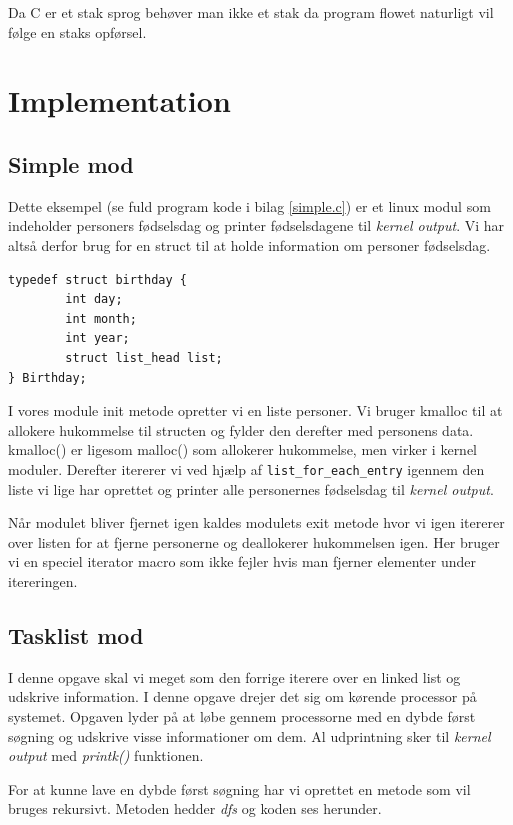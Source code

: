 \documentclass[danish]{report}
\begin{document}
Da C er et stak sprog behøver man ikke et stak da program flowet naturligt vil følge en staks opførsel.


\chapter{Implementation}
\begingroup
\let\clearpage\relax
\section{Simple mod}

Dette eksempel (se fuld program kode i bilag \ref{simple.c}) er et linux modul som indeholder personers fødselsdag og printer fødselsdagene til \textit{kernel output}. Vi har altså derfor brug for en struct til at holde information om personer fødselsdag.

\begin{lstlisting}
typedef struct birthday {
        int day;
        int month;
        int year;
        struct list_head list;
} Birthday;
\end{lstlisting}

I vores module init metode opretter vi en liste personer. Vi bruger kmalloc til at allokere hukommelse til structen og fylder den derefter med personens data. kmalloc() er ligesom malloc() som allokerer hukommelse, men virker i kernel moduler. Derefter itererer vi ved hjælp af \texttt{list\_for\_each\_entry} igennem den liste vi lige har oprettet og printer alle personernes fødselsdag til \textit{kernel output}.

Når modulet bliver fjernet igen kaldes modulets exit metode hvor vi igen itererer over listen for at fjerne personerne og deallokerer hukommelsen igen. Her bruger vi en speciel iterator macro som ikke fejler hvis man fjerner elementer under itereringen.

\section{Tasklist mod}
I denne opgave skal vi meget som den forrige iterere over en linked list og udskrive information. I denne opgave drejer det sig om kørende processor på systemet. Opgaven lyder på at løbe gennem processorne med en dybde først søgning og udskrive visse informationer om dem. Al udprintning sker til \textit{kernel output} med \textit{printk()} funktionen.

For at kunne lave en dybde først søgning har vi oprettet en metode som vil bruges rekursivt. Metoden hedder \textit{dfs} og koden ses herunder.
\end{document}
